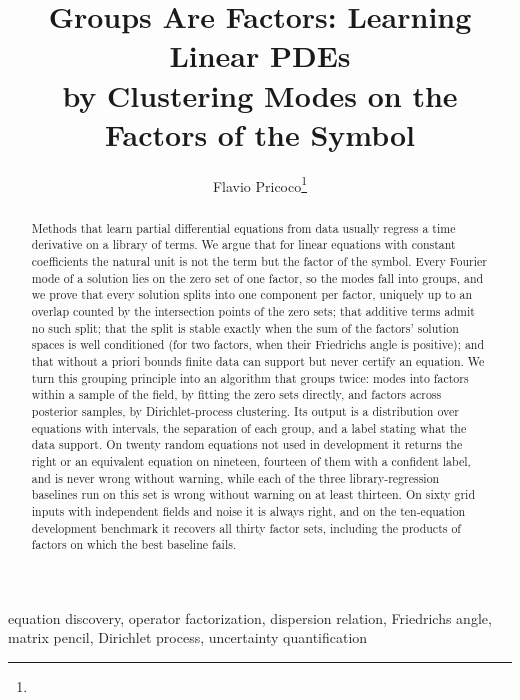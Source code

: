 


\title{Groups Are Factors: Learning Linear PDEs\\by Clustering Modes on the Factors of the Symbol}
\author{Flavio Pricoco\thanks{}}


\maketitle

\begin{abstract}
Methods that learn partial differential equations from data usually regress a time derivative on a library of terms.
We argue that for linear equations with constant coefficients the natural unit is not the term but the factor of the
symbol. Every Fourier mode of a solution lies on the zero set of one factor, so the modes fall into groups, and we prove
that every solution splits into one component per factor, uniquely up to an overlap counted by the intersection points
of the zero sets; that additive terms admit no such split; that the split is stable exactly when the sum of the
factors' solution spaces is well conditioned (for two factors, when their Friedrichs angle is positive); and that
without a priori bounds finite data can support but never certify an equation. We turn this grouping principle into an
algorithm that groups twice: modes into factors within a sample of the field, by fitting the zero sets directly, and
factors across posterior samples, by Dirichlet-process clustering. Its output is a distribution over equations with
intervals, the separation of each group, and a label stating what the data support. On twenty random equations not used
in development it returns the right or an equivalent equation on nineteen, fourteen of them with a confident label, and
is never wrong without warning, while
each of the three library-regression baselines run on this set is wrong without warning on at least thirteen. On sixty
grid inputs with independent fields and noise it is always right, and on the ten-equation development benchmark it
recovers all thirty factor sets, including the products of factors on which the
best baseline fails.
\end{abstract}

\begin{keywords}
equation discovery, operator factorization, dispersion relation, Friedrichs angle, matrix pencil, Dirichlet process,
uncertainty quantification
\end{keywords}

